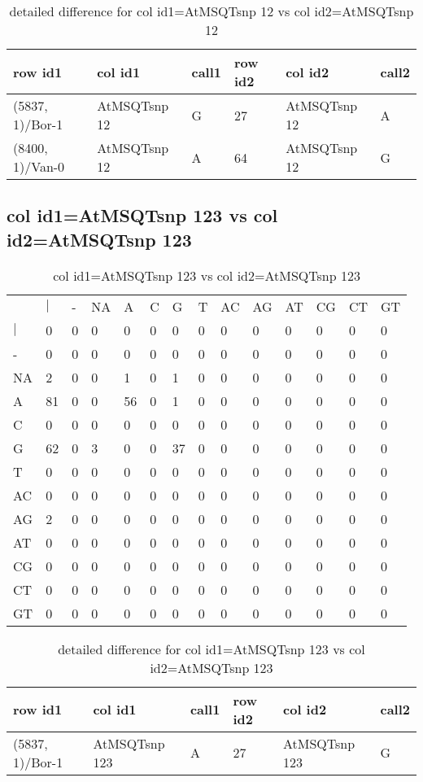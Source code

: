\begin{center}
\begin{longtable}{|l|l|l|l|l|l|}
\caption{detailed difference for col id1=AtMSQTsnp 12 vs col id2=AtMSQTsnp 12} \label{table_dm511}\\
\hline
row id1&col id1&call1&row id2&col id2&call2\\
\hline
(5837, 1)/Bor-1&AtMSQTsnp 12&G&27&AtMSQTsnp 12&A\\
(8400, 1)/Van-0&AtMSQTsnp 12&A&64&AtMSQTsnp 12&G\\
\hline
\end{longtable}
\end{center}

\subsection{col id1=AtMSQTsnp 123 vs col id2=AtMSQTsnp 123}
\begin{center}
\begin{longtable}{|l|l|l|l|l|l|l|l|l|l|l|l|l|l|}
\caption{col id1=AtMSQTsnp 123 vs col id2=AtMSQTsnp 123} \label{table_dm512}\\
\hline
\\
\hline
&$|$&-&NA&A&C&G&T&AC&AG&AT&CG&CT&GT\\
$|$&0&0&0&0&0&0&0&0&0&0&0&0&0\\
-&0&0&0&0&0&0&0&0&0&0&0&0&0\\
NA&2&0&0&1&0&1&0&0&0&0&0&0&0\\
A&81&0&0&56&0&1&0&0&0&0&0&0&0\\
C&0&0&0&0&0&0&0&0&0&0&0&0&0\\
G&62&0&3&0&0&37&0&0&0&0&0&0&0\\
T&0&0&0&0&0&0&0&0&0&0&0&0&0\\
AC&0&0&0&0&0&0&0&0&0&0&0&0&0\\
AG&2&0&0&0&0&0&0&0&0&0&0&0&0\\
AT&0&0&0&0&0&0&0&0&0&0&0&0&0\\
CG&0&0&0&0&0&0&0&0&0&0&0&0&0\\
CT&0&0&0&0&0&0&0&0&0&0&0&0&0\\
GT&0&0&0&0&0&0&0&0&0&0&0&0&0\\
\hline
\end{longtable}
\end{center}

\begin{center}
\begin{longtable}{|l|l|l|l|l|l|}
\caption{detailed difference for col id1=AtMSQTsnp 123 vs col id2=AtMSQTsnp 123} \label{table_dm513}\\
\hline
row id1&col id1&call1&row id2&col id2&call2\\
\hline
(5837, 1)/Bor-1&AtMSQTsnp 123&A&27&AtMSQTsnp 123&G\\
\hline
\end{longtable}
\end{center}

